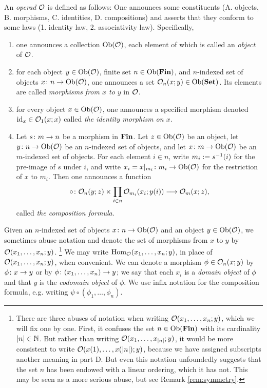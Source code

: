 \begin{definition}\label{def:operad}

An {\em operad} $\mathcal{O}$ is defined as follows: One announces some constituents (A. objects, B. morphisms, C. identities, D. compositions) and asserts that they conform to some laws (1. identity law, 2. associativity law). Specifically, 
\begin{enumerate}[\hsp A.]
\item one announces a collection $\textnormal{Ob}(\mathcal{O})$, each element of which is called an {\em object} of $\mathcal{O}$.
\item for each object $y\in\textnormal{Ob}(\mathcal{O})$, finite set $n\in\textnormal{Ob}({\bf Fin})$, and $n$-indexed set of objects $x\colon n\rightarrow\textnormal{Ob}(\mathcal{O})$, one announces a set $\mathcal{O}_n(x;y)\in\textnormal{Ob}({\bf Set})$. Its elements are called {\em morphisms from $x$ to $y$} in $\mathcal{O}$. 
\item for every object $x\in\textnormal{Ob}(\mathcal{O})$, one announces a specified morphism denoted $\textnormal{id}_x\in\mathcal{O}_1(x;x)$ called {\em the identity morphism on $x$}.
\item Let $s\colon m\rightarrow n$ be a morphism in ${\bf Fin}$. Let $z\in\textnormal{Ob}(\mathcal{O})$ be an object, let $y\colon n\rightarrow\textnormal{Ob}(\mathcal{O})$ be an $n$-indexed set of objects, and let $x\colon m\rightarrow\textnormal{Ob}(\mathcal{O})$ be an $m$-indexed set of objects. For each element $i\in n$, write $m_i:=s^\m1(i)$ for the pre-image of $s$ under $i$, and write $x_i=x|_{m_i}\colon m_i\rightarrow\textnormal{Ob}(\mathcal{O})$ for the restriction of $x$ to $m_i$. Then one announces a function 
\begin{align}\label{dia:composition formula}
\circ\colon\mathcal{O}_n(y;z)\times\prod_{i\in n}\mathcal{O}_{m_i}(x_i;y(i))\longrightarrow\mathcal{O}_{m}(x;z),
\end{align} 
called {\em the composition formula}.
\end{enumerate}
Given an $n$-indexed set of objects $x\colon n\rightarrow\textnormal{Ob}(\mathcal{O})$ and an object $y\in\textnormal{Ob}(\mathcal{O})$, we sometimes abuse notation and denote the set of morphisms from $x$ to $y$ by $\mathcal{O}(x_1,\ldots,x_n;y)$.
\footnote{There are three abuses of notation when writing $\mathcal{O}(x_1,\ldots,x_n;y)$, which we will fix one by one. First, it confuses the set $n\in\textnormal{Ob}({\bf Fin})$ with its cardinality $|n|\in{\mathbb N}$. But rather than writing $\mathcal{O}(x_1,\ldots,x_{|n|};y)$, it would be more consistent to write $\mathcal{O}(x(1),\ldots,x(|n|);y)$, because we have assigned subscripts another meaning in part D. But even this notation unfoundedly suggests that the set $n$ has been endowed with a linear ordering, which it has not. This may be seen as a more serious abuse, but see Remark \ref{rem:symmetry}.}
We may write $\textnormal{Hom}_\mathcal{O}(x_1,\ldots,x_n;y)$, in place of $\mathcal{O}(x_1,\ldots,x_n;y)$, when convenient. We can denote a morphism $\phi\in\mathcal{O}_n(x;y)$ by $\phi\colon x\rightarrow y$ or by $\phi\colon (x_1,\ldots,x_n)\rightarrow y$; we say that each $x_i$ is a {\em domain object} of $\phi$ and that $y$ is the {\em codomain object} of $\phi$. We use infix notation for the composition formula, e.g. writing $\psi\circ(\phi_1,\ldots,\phi_n)$.


\end{definition}
